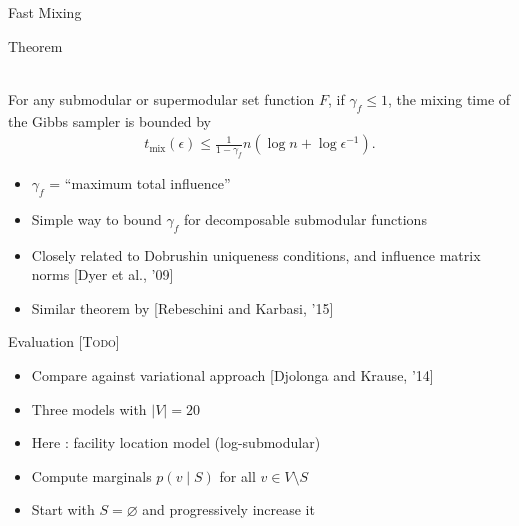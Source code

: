\documentclass[mathserif]{beamer}
\newcommand{\todo}[1]{{\scriptsize\color{yellow}\textsc{[Todo]}}}
\newcommand{\qcite}[1]{{\scriptsize\color{col2}[#1]}}
\newcommand{\qtheorem}[1]{%
\begin{tcolorbox}[enhanced jigsaw,size=tight,boxsep=7pt,boxrule=0.7pt,coltext=textcolor,colframe=col2,colback=col1,opacityback=0,opacityframe=1]
\begin{minipage}{\textwidth}
{\color{col2}\strut Theorem}\\[0.7em]
#1
\end{minipage}
\end{tcolorbox}%
}
\begin{document}
\begin{frame}{Fast Mixing}
\vspace{0.5em}
\qtheorem{
For any submodular or supermodular set function $F$, if $\gamma_f \leq 1$, the mixing time of the Gibbs sampler is bounded by
\vspace{-0.5em}
\begin{align*}
t_{\textrm{mix}}(\epsilon) \leq \frac{1}{1 - \gamma_f} n \left(\log n + \log\epsilon^{-1}\right).
\end{align*}
}

\vspace{0.5em}
\begin{itemize}
\item<2-> $\gamma_f$ = ``maximum total influence''
\vspace{0.5em}
\item<3-> Simple way to bound $\gamma_f$ for decomposable submodular functions
\vspace{0.5em}
\item<4-> Closely related to Dobrushin uniqueness conditions, and influence matrix norms \qcite{Dyer et al., '09}
\vspace{0.5em}
\item<5-> Similar theorem by \qcite{Rebeschini and Karbasi, '15}
\end{itemize}
\end{frame}

\begin{frame}{Evaluation \todo{}}
\vspace{0.5em}
\begin{itemize}
\item<1-> Compare against variational approach \qcite{Djolonga and Krause, '14}
\vspace{1.5em}
\item<2-> Three models with $|V| = 20$
\vspace{1.5em}
\item<3-> Here : facility location model (log-submodular)
\vspace{1.5em}
\item<4-> Compute marginals $p(v \mid S)$ for all $v \in V \setminus S$
\vspace{1.5em}
\item<5-> Start with $S = \varnothing$ and progressively increase it
\end{itemize}
\end{frame}
\end{document}
